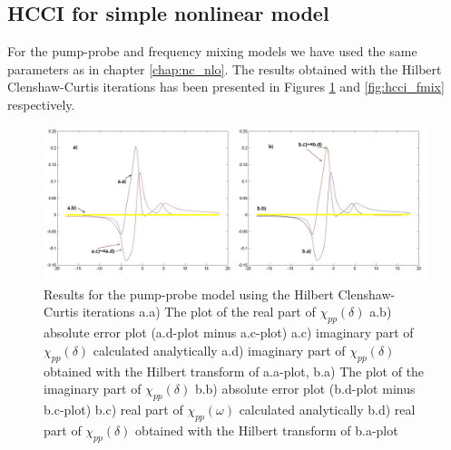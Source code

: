 \documentclass[12pt,twoside,a4paper]{article}
\numberwithin{equation}{subsection}
\numberwithin{figure}{subsection}
\begin{document}
\subsection{HCCI for simple nonlinear model} \label{chap:hcc_nlo}

For the pump-probe and frequency mixing models we have used the same parameters as in chapter \ref{chap:nc_nlo}. The results
obtained with the Hilbert Clenshaw-Curtis iterations has been presented in Figures \ref{fig:hcci_pnp} and \ref{fig:hcci_fmix}
respectively.

\begin{figure} 
  \includegraphics[width=150mm]{img/hcc_pnp.png}
  \caption{Results for the pump-probe model using the Hilbert Clenshaw-Curtis iterations
     a.a) The plot of the real part of ${\chi_{pp}}(\delta )$
     a.b) absolute error plot (a.d-plot minus a.c-plot) 
     a.c) imaginary part of ${\chi_{pp}}(\delta )$ calculated analytically 
     a.d) imaginary part of ${\chi_{pp}}(\delta )$ obtained with the Hilbert transform of a.a-plot, 
     b.a) The plot of the imaginary part of ${\chi_{pp}}(\delta )$ 
     b.b) absolute error plot (b.d-plot minus b.c-plot) 
     b.c) real part of $\chi_{pp} (\omega )$ calculated analytically 
     b.d) real part of ${\chi_{pp}}(\delta )$ obtained with the Hilbert transform of b.a-plot 
     \label{fig:hcci_pnp}
     }
\end{figure} 
\end{document}
